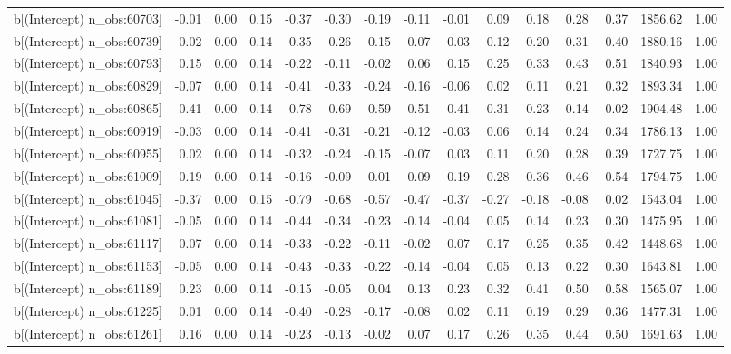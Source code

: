 \begin{table}[ht]
\begin{tabular}{rrrrrrrrrrrrrrr}
  b[(Intercept) n\_obs:60703] & -0.01 & 0.00 & 0.15 & -0.37 & -0.30 & -0.19 & -0.11 & -0.01 & 0.09 & 0.18 & 0.28 & 0.37 & 1856.62 & 1.00 \\ 
  b[(Intercept) n\_obs:60739] & 0.02 & 0.00 & 0.14 & -0.35 & -0.26 & -0.15 & -0.07 & 0.03 & 0.12 & 0.20 & 0.31 & 0.40 & 1880.16 & 1.00 \\ 
  b[(Intercept) n\_obs:60793] & 0.15 & 0.00 & 0.14 & -0.22 & -0.11 & -0.02 & 0.06 & 0.15 & 0.25 & 0.33 & 0.43 & 0.51 & 1840.93 & 1.00 \\ 
  b[(Intercept) n\_obs:60829] & -0.07 & 0.00 & 0.14 & -0.41 & -0.33 & -0.24 & -0.16 & -0.06 & 0.02 & 0.11 & 0.21 & 0.32 & 1893.34 & 1.00 \\ 
  b[(Intercept) n\_obs:60865] & -0.41 & 0.00 & 0.14 & -0.78 & -0.69 & -0.59 & -0.51 & -0.41 & -0.31 & -0.23 & -0.14 & -0.02 & 1904.48 & 1.00 \\ 
  b[(Intercept) n\_obs:60919] & -0.03 & 0.00 & 0.14 & -0.41 & -0.31 & -0.21 & -0.12 & -0.03 & 0.06 & 0.14 & 0.24 & 0.34 & 1786.13 & 1.00 \\ 
  b[(Intercept) n\_obs:60955] & 0.02 & 0.00 & 0.14 & -0.32 & -0.24 & -0.15 & -0.07 & 0.03 & 0.11 & 0.20 & 0.28 & 0.39 & 1727.75 & 1.00 \\ 
  b[(Intercept) n\_obs:61009] & 0.19 & 0.00 & 0.14 & -0.16 & -0.09 & 0.01 & 0.09 & 0.19 & 0.28 & 0.36 & 0.46 & 0.54 & 1794.75 & 1.00 \\ 
  b[(Intercept) n\_obs:61045] & -0.37 & 0.00 & 0.15 & -0.79 & -0.68 & -0.57 & -0.47 & -0.37 & -0.27 & -0.18 & -0.08 & 0.02 & 1543.04 & 1.00 \\ 
  b[(Intercept) n\_obs:61081] & -0.05 & 0.00 & 0.14 & -0.44 & -0.34 & -0.23 & -0.14 & -0.04 & 0.05 & 0.14 & 0.23 & 0.30 & 1475.95 & 1.00 \\ 
  b[(Intercept) n\_obs:61117] & 0.07 & 0.00 & 0.14 & -0.33 & -0.22 & -0.11 & -0.02 & 0.07 & 0.17 & 0.25 & 0.35 & 0.42 & 1448.68 & 1.00 \\ 
  b[(Intercept) n\_obs:61153] & -0.05 & 0.00 & 0.14 & -0.43 & -0.33 & -0.22 & -0.14 & -0.04 & 0.05 & 0.13 & 0.22 & 0.30 & 1643.81 & 1.00 \\ 
  b[(Intercept) n\_obs:61189] & 0.23 & 0.00 & 0.14 & -0.15 & -0.05 & 0.04 & 0.13 & 0.23 & 0.32 & 0.41 & 0.50 & 0.58 & 1565.07 & 1.00 \\ 
  b[(Intercept) n\_obs:61225] & 0.01 & 0.00 & 0.14 & -0.40 & -0.28 & -0.17 & -0.08 & 0.02 & 0.11 & 0.19 & 0.29 & 0.36 & 1477.31 & 1.00 \\ 
  b[(Intercept) n\_obs:61261] & 0.16 & 0.00 & 0.14 & -0.23 & -0.13 & -0.02 & 0.07 & 0.17 & 0.26 & 0.35 & 0.44 & 0.50 & 1691.63 & 1.00 \\ 

\end{tabular}
\end{table}

